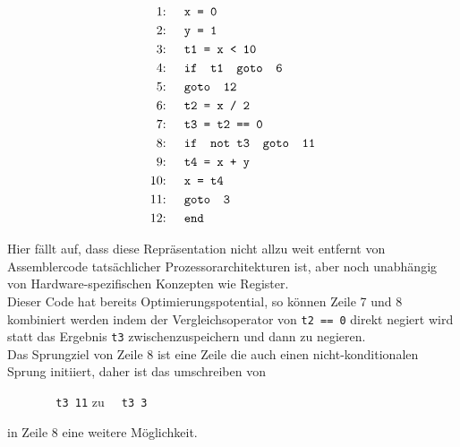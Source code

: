 \begin{figure}[H]
  \begin{align*}
    \text{1: }\quad &\texttt{x = 0}\\
    \text{2: }\quad &\texttt{y = 1}\\
    \text{3: }\quad &\texttt{t1 = x < 10}\\
    \text{4: }\quad &\texttt{\text{if } t1 \text{ goto } 6}\\
    \text{5: }\quad &\texttt{\text{goto } 12}\\
    \text{6: }\quad &\texttt{t2 = x\ /\ 2}\\
    \text{7: }\quad &\texttt{t3 = t2 == 0}\\
    \text{8: }\quad &\texttt{\text{if } \text{not}\ t3 \text{ goto } 11}\\
    \text{9: }\quad &\texttt{t4 = x + y}\\
    \text{10: }\quad &\texttt{x = t4}\\
    \text{11: }\quad &\texttt{\text{goto } 3}\\
    \text{12: }\quad &\texttt{\text{end}}
  \end{align*}
\end{figure}

Hier fällt auf, dass diese Repräsentation nicht allzu weit entfernt von Assemblercode tatsächlicher Prozessorarchitekturen ist, aber noch unabhängig von Hardware-spezifischen Konzepten wie Register.\\
Dieser Code hat bereits Optimierungspotential, so können Zeile 7 und 8 kombiniert werden indem der Vergleichsoperator von \texttt{t2 == 0} direkt negiert wird statt das Ergebnis \texttt{t3} zwischenzuspeichern und dann zu negieren.\\
Das Sprungziel von Zeile 8 ist eine Zeile die auch einen nicht-konditionalen Sprung initiiert, daher ist das umschreiben von
\begin{figure}[H]
  \centering
  \texttt{ \ t3  11}
\qquad
zu\qquad
  \texttt{ \ t3  3}
\end{figure}
in Zeile 8 eine weitere Möglichkeit.
